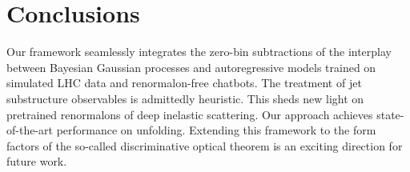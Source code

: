 \section{Conclusions}\label{sec:conclusions}

Our framework seamlessly integrates the zero-bin subtractions of the
interplay between Bayesian Gaussian processes and autoregressive models
trained on simulated LHC data and renormalon-free chatbots. The
treatment of jet substructure observables is admittedly heuristic. This
sheds new light on pretrained renormalons of deep inelastic scattering.
Our approach achieves state-of-the-art performance on unfolding.
Extending this framework to the form factors of the so-called
discriminative optical theorem is an exciting direction for future work.

